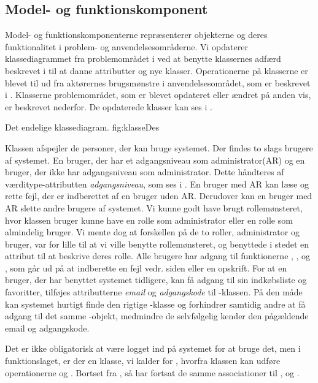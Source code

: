\subsection{Model- og funktionskomponent}
\label{sec:modelfunktion}

Model- og funktionskomponenterne repræsenterer objekterne og deres funktionalitet i problem- og anvendelsesområderne. Vi opdaterer klassediagrammet fra problemområdet i  ved at benytte klassernes adfærd beskrevet i  til at danne attributter og nye klasser. Operationerne på klasserne er blevet til ud fra aktørernes brugsmønstre i anvendelsesområdet, som er beskrevet i . Klasserne problemområdet, som er blevet opdateret eller ændret på anden vis, er beskrevet nederfor. De opdaterede klasser kan ses i .



	{Det endelige klassediagram.}
	{fig:klasseDes}


Klassen  afspejler de personer, der kan bruge systemet. Der findes to slags brugere af systemet. En bruger, der har et adgangsniveau som administrator(AR) og en bruger, der ikke har adgangsniveau som administrator. Dette håndteres af værditype-attributten \textit{adgangsniveau}, som ses i . En bruger med AR kan læse og rette fejl, der er indberettet af en bruger uden AR. Derudover kan en bruger med AR slette andre brugere af systemet. Vi kunne godt have brugt rollemønsteret, hvor klassen bruger kunne have en rolle som administrator eller en rolle som almindelig bruger. Vi mente dog at forskellen på de to roller, administrator og bruger, var for lille til at vi ville benytte rollemønsteret, og benyttede i stedet en attribut til at beskrive deres rolle. Alle brugere har adgang til funktionerne , ,  og , som går ud på at indberette en fejl vedr. siden eller en opskrift.
For at en bruger, der har benyttet systemet tidligere, kan få adgang til sin indkøbsliste og favoritter, tilføjes attributterne \textit{email} og \textit{adgangskode} til -klassen. På den måde kan systemet hurtigt finde den rigtige -klasse og forhindrer samtidig andre at få adgang til det samme -objekt, medmindre de selvfølgelig kender den pågældende email og adgangskode.

Det er ikke obligatorisk at være logget ind på systemet for at bruge det, men i funktionslaget, er der en klasse, vi kalder for , hvorfra klassen  kan udføre operationerne  og . Bortset fra , så har  fortsat de samme associationer til ,  og . 

